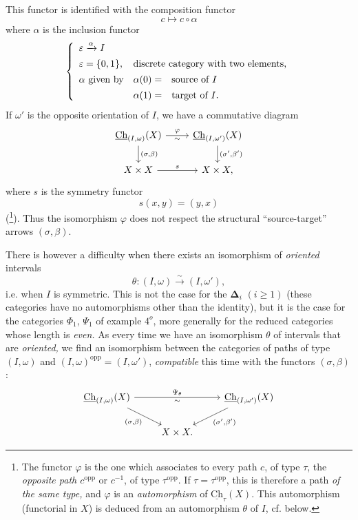\documentclass[11pt]{article}
\newcommand{\msp}[1]{\marginpar{\footnotesize [#1]}}
\newcommand{\Ch}{\underline{\mathrm{Ch}}}
\newcommand{\bDelta}{\boldsymbol{\Delta}}
\newcommand{\opp}{\mathrm{opp}}
\begin{document}
This functor is identified with the composition functor
\[
c \longmapsto c \circ \alpha
\]
where $\alpha$ is the inclusion functor
\[
\left\{
\begin{array}{lll}
\varepsilon \xrightarrow{\alpha} I & & \\[1ex]
\varepsilon = \{0,1\}, & \multicolumn{2}{l}{\text{discrete category with two elements,}} \\[1ex]
\alpha \text{ given by} & \alpha(0) = & \text{source of } I \\[1ex]
 & \alpha(1) = & \text{target of } I.
\end{array}
\right.
\]
If $\omega'$ is the opposite orientation of $I$, we have a commutative diagram
\[
\begin{tikzcd}
\Ch_{(I,\omega)}(X) \arrow[r, "\varphi", "\sim"'] \arrow[d, "{(\sigma,\beta)}"] & \Ch_{(I,\omega')}(X) \arrow[d, "{(\sigma',\beta')}"] \\
X \times X \arrow[r, "s"] & X \times X,
\end{tikzcd}
\]
where $s$ is the symmetry functor
\[
s(x,y) = (y,x)
\]
(\footnote[6]{The functor $\varphi$ is the one which associates to every path $c$, of type $\tau$, the \textit{opposite path $c^{\opp}$} or $c^{-1}$, of type $\tau^{\opp}$. If $\tau = \tau^{\opp}$, this is therefore a path \textit{of the same type,} and $\varphi$ is an \textit{automorphism} of $\Ch_\tau(X)$. This automorphism (functorial in $X$) is deduced from an automorphism $\theta$ of $I$, cf. below.}). Thus the isomorphism $\varphi$ does not respect the structural ``source-target'' arrows $(\sigma,\beta)$.

There is however a difficulty when there exists an isomorphism of \textit{oriented} intervals
\[
\theta : (I,\omega) \xrightarrow{\sim} (I,\omega'),
\]
i.e. when $I$ is symmetric. This is not the case for the $\bDelta_i$ $(i \geq 1)$ (these categories have no automorphisms other than the identity), but it is the case for the categories $\Phi_1$, $\Psi_1$ of example $4^o$, more generally \msp{page 19} for the reduced categories whose length is \textit{even.} As every time we have an isomorphism $\theta$ of intervals that are \textit{oriented,} we find an isomorphism between the categories of paths of type $(I,\omega)$ and $(I,\omega)^{\opp} = (I,\omega')$, \textit{compatible} this time with the functors $(\sigma,\beta)$:
\[
\begin{tikzcd}
\Ch_{(I,\omega)}(X) \arrow[rr, "\Psi_\theta", "\sim"'] \arrow[dr, "{(\sigma,\beta)}"'] & & \Ch_{(I,\omega')}(X) \arrow[dl, "{(\sigma',\beta')}"] \\
 & X \times X. &
\end{tikzcd}
\]
\end{document}
